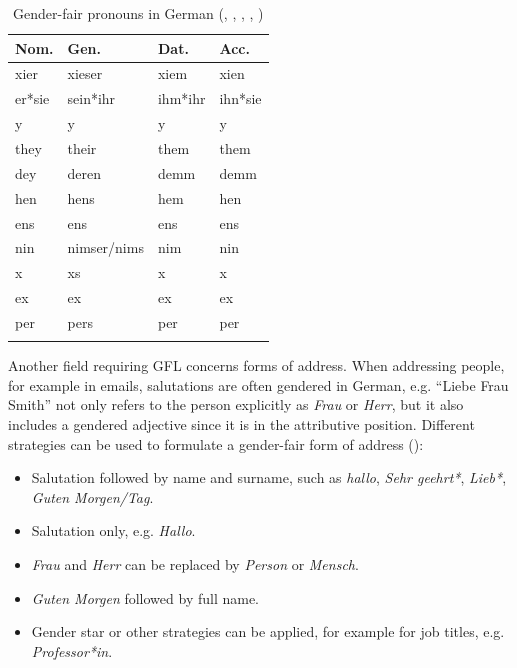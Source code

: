 \begin{table}[!htb]
    \centering
    \caption[Gender-fair pronouns in German]{Gender-fair pronouns in German (\cite[36f]{hornscheidt2021wie}, \cite{heger2020xier}, \cite[294]{hornscheidt2012feministische}, \cite[33]{prona2016mein}, \cite[47]{de2008sylvain})}
    \label{tab:genderfairpronouns}
    \begin{tabular}{m{2cm}m{2cm}m{2cm}m{2cm}}
    \lsptoprule
         \textbf{Nom.} & \textbf{Gen.} & \textbf{Dat.} & \textbf{Acc.} \\
\midrule
         xier & xieser & xiem & xien \\
         er*sie & sein*ihr & ihm*ihr & ihn*sie \\
         y & y & y & y \\
         they & their & them & them \\
         dey & deren & demm & demm \\
         hen & hens & hem & hen \\
         ens & ens & ens & ens \\
         nin & nimser/nims & nim & nin \\
         x & xs & x & x \\
         ex & ex & ex & ex \\
         per & pers & per & per \\
\lspbottomrule
    \end{tabular}
\end{table}

Another field requiring GFL concerns forms of address. When addressing people, for example in emails, salutations are often gendered in German, e.g. ``Liebe Frau Smith'' not only refers to the person explicitly as \textit{Frau} or \textit{Herr}, but it also includes a gendered adjective since it is in the attributive position. Different strategies can be used to formulate a gender-fair form of address (\cite[77]{hornscheidt2021wie}): 
\begin{itemize}
\setlength\itemsep{-0.5em}
    \item Salutation followed by name and surname, such as \textit{hallo}, \textit{Sehr geehrt*}, \textit{Lieb*}, \textit{Guten Morgen/Tag}.
    \item Salutation only, e.g. \textit{Hallo}.
    \item \textit{Frau} and \textit{Herr} can be replaced by \textit{Person} or \textit{Mensch}.
    \item \textit{Guten Morgen} followed by full name.
    \item Gender star or other strategies can be applied, for example for job titles, e.g. \textit{Professor*in}.
\end{itemize}

